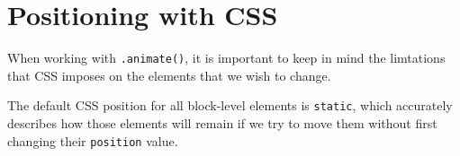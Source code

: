 \documentclass[a4paper,11pt]{book}
\begin{document}
\section{Positioning with CSS}
When working with \verb|.animate()|, it is important to keep in mind the
limtations that CSS imposes on the elements that we wish to change.

The default CSS position for all block-level elements is \verb|static|, which
accurately describes how those elements will remain if we try to move them
without first changing their \verb|position| value.
\end{document}

